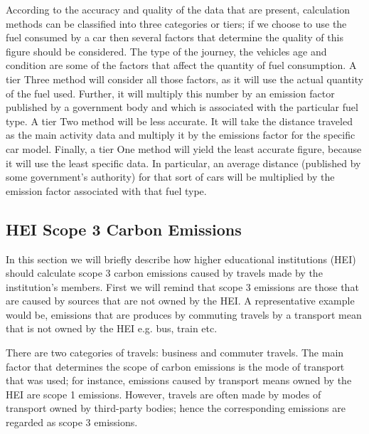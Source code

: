 According to the accuracy and quality of the data that are present, calculation methods can be classified into three categories or tiers; if we choose to use the fuel consumed by a car then several factors that determine the quality of this figure should be considered. The type of the journey, the vehicles age and condition are some of the factors that affect the quantity of fuel consumption. A tier Three method will consider all those factors, as it will use the actual quantity of the fuel used. Further, it will multiply this number by an emission factor published by a government body and which is associated with the particular fuel type. A tier Two method will be less accurate. It will take the distance traveled as the main activity data and multiply it by the emissions factor for the specific car model. Finally, a tier One method will yield the least accurate figure, because it will use the least specific data. In particular, an average distance (published by some government's authority) for that sort of cars will be multiplied by the emission factor associated with that fuel type.

\subsection{HEI Scope 3 Carbon Emissions}

In this section we will briefly describe how higher educational institutions (HEI) should calculate scope 3 carbon emissions caused by travels made by the institution's members\cite{reference24}. First we will remind that scope 3 emissions are those that are caused by sources that are not owned by the HEI. A representative example would be, emissions that are produces by commuting travels by a transport mean that is not owned by the HEI e.g. bus, train etc.

There are two categories of travels: business and commuter travels. The main factor that determines the scope of carbon emissions is the mode of transport that was used; for instance, emissions caused by transport means owned by the HEI are scope 1 emissions. However, travels are often made by modes of transport owned by third-party bodies; hence the corresponding emissions are regarded as scope 3 emissions.

